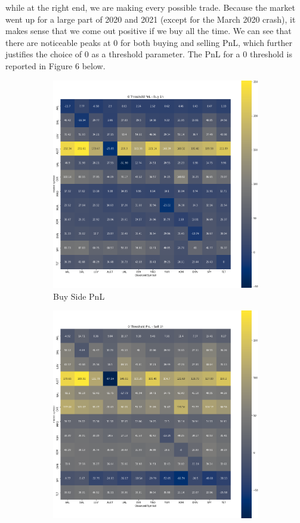 \documentclass{article}
\begin{document}
while at the right end, we are making every possible trade. Because the market went
up for a large part of 2020 and 2021 (except for the March 2020 crash), it makes sense
that we come out positive if we buy all the time. 
We can see that there are noticeable peaks at 0 for both buying and selling PnL, which
further justifies the choice of 0 as a threshold parameter. The PnL for a
0 threshold is reported in Figure 6 below.
\begin{figure}[h!]
  \centering
  \begin{subfigure}{.5\textwidth}
    \centering
    \includegraphics[width=.95\linewidth]{../Figures/pair_buy_pnl_1h.png}
    \caption{Buy Side PnL}
  \end{subfigure}%
  \begin{subfigure}{.5\textwidth}
    \centering
    \includegraphics[width=.95\linewidth]{../Figures/pair_sell_pnl_1h.png}

\end{subfigure}
\end{figure}
\end{document}
